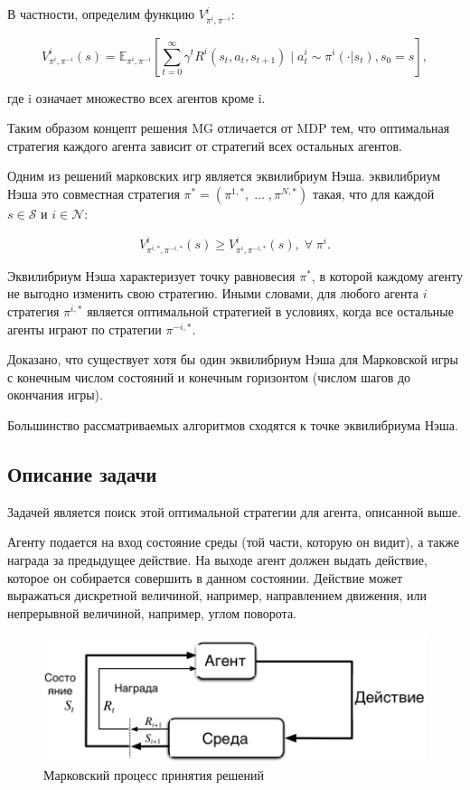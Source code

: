 В частности, определим функцию \( V^i_{\pi^i, \pi^{-i}} \):

\begin{equation}
	V^i_{\pi^i, \pi^{-i}}(s) = \mathbb{E}_{\pi^i, \pi^{-i}} \left[ \sum_{t=0}^{\infty} \gamma^t R^i(s_t, a_t, s_{t+1}) \mid a^i_t \sim \pi^i(\cdot|s_t), s_0=s \right],
\end{equation}

где i означает множество всех агентов кроме i.

Таким образом концепт решения MG отличается от MDP тем, что оптимальная стратегия каждого агента зависит от стратегий всех остальных агентов.

Одним из решений марковских игр является эквилибриум Нэша. эквилибриум Нэша это совместная стратегия \(\pi^*=(\pi^{1,*}, \; \dots \;, \pi^{N, *})\) такая, что для каждой \(s \in \mathcal{S}\) и  \(i \in \mathcal{N}\):


\begin{equation}
	V^i_{\pi^{i, *}, \pi^{-i, *}}(s) \geq  V^i_{\pi^i, \pi^{-i, *}}(s), \; \forall  \; \pi^i.
\end{equation}

Эквилибриум Нэша характеризует точку равновесия \(\pi^*\), в которой каждому агенту не выгодно изменить свою стратегию.
Иными словами, для любого агента \(i\) стратегия \(\pi^{i, *}\) является оптимальной стратегией в условиях, когда все остальные агенты играют по стратегии \(\pi^{-i, *}\).

Доказано, что существует хотя бы один эквилибриум Нэша для Марковской игры с конечным числом состояний и конечным горизонтом (числом шагов до окончания игры).

Большинство рассматриваемых алгоритмов сходятся к точке эквилибриума Нэша.

\subsection{Описание задачи}

Задачей является поиск этой оптимальной стратегии для агента, описанной выше.

Агенту подается на вход состояние среды (той части, которую он видит), а также награда за предыдущее действие. 
На выходе агент должен выдать действие, которое он собирается совершить в данном состоянии.
Действие может выражаться дискретной величиной, например, направлением движения, или непрерывной величиной, например, углом поворота.

\begin{figure}[H]
	\label{fig:mdp}
		\includegraphics[width=\textwidth]{./inc/img/mdp.png}
		\caption{Марковский процесс принятия решений}
\end{figure}

